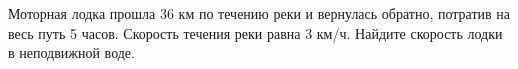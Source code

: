 \begin{ex}
	\begin{condition}
		Моторная лодка прошла 36 км по течению реки и вернулась обратно, потратив на весь путь 5 часов. Скорость течения реки равна 3 км/ч. Найдите скорость лодки в неподвижной воде.
	\end{condition}
\end{ex}